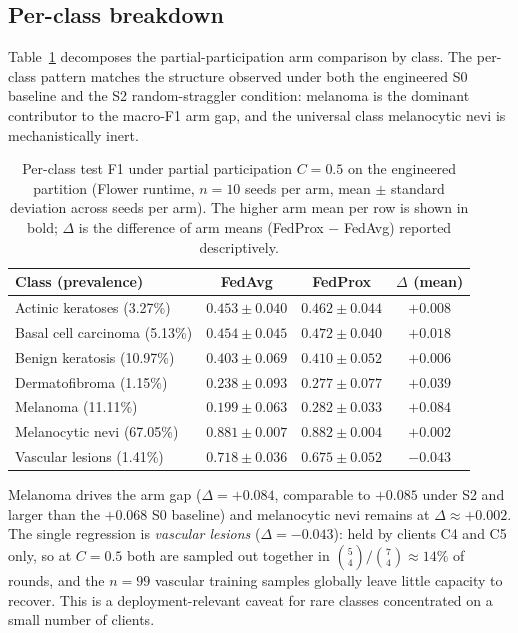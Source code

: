 \documentclass[11pt,a4paper]{report}
\begin{document}
\subsection{Per-class breakdown}
\label{sec:sh-partial-per-class}

Table~\ref{tab:sh-partial-per-class} decomposes the
partial-participation arm comparison by class. The per-class
pattern matches the structure observed under both the engineered
S0 baseline and the S2 random-straggler condition: melanoma is
the dominant contributor to the macro-F1 arm gap, and the
universal class melanocytic nevi is mechanistically inert.

\begin{table}[!htbp]
\centering
\caption{Per-class test F1 under partial participation $C = 0.5$
on the engineered partition (Flower runtime, $n = 10$ seeds per
arm, mean $\pm$ standard deviation across seeds per arm). The
higher arm mean per row is shown in bold; $\Delta$ is the
difference of arm means (FedProx $-$ FedAvg) reported
descriptively.}
\label{tab:sh-partial-per-class}
\small
\begin{tabular}{lccc}
\toprule
Class (prevalence) & FedAvg & FedProx & $\Delta$ (mean) \\
\midrule
Actinic keratoses (3.27\%)        & $0.453 \pm 0.040$ & $\mathbf{0.462 \pm 0.044}$ & $+0.008$ \\
Basal cell carcinoma (5.13\%)     & $0.454 \pm 0.045$ & $\mathbf{0.472 \pm 0.040}$ & $+0.018$ \\
Benign keratosis (10.97\%)        & $0.403 \pm 0.069$ & $\mathbf{0.410 \pm 0.052}$ & $+0.006$ \\
Dermatofibroma (1.15\%)           & $0.238 \pm 0.093$ & $\mathbf{0.277 \pm 0.077}$ & $+0.039$ \\
Melanoma (11.11\%)                & $0.199 \pm 0.063$ & $\mathbf{0.282 \pm 0.033}$ & $\mathbf{+0.084}$ \\
Melanocytic nevi (67.05\%)        & $\mathbf{0.881 \pm 0.007}$ & $0.882 \pm 0.004$ & $+0.002$ \\
Vascular lesions (1.41\%)         & $\mathbf{0.718 \pm 0.036}$ & $0.675 \pm 0.052$ & $-0.043$ \\
\bottomrule
\end{tabular}
\end{table}

Melanoma drives the arm gap ($\Delta = +0.084$, comparable to
$+0.085$ under S2 and larger than the $+0.068$ S0 baseline) and
melanocytic nevi remains at $\Delta \approx +0.002$. The single
regression is \emph{vascular lesions} ($\Delta = -0.043$): held by
clients C4 and C5 only, so at $C = 0.5$ both are sampled out
together in $\binom{5}{4}/\binom{7}{4} \approx 14\%$ of rounds,
and the $n = 99$ vascular training samples globally leave little
capacity to recover. This is a deployment-relevant caveat for rare
classes concentrated on a small number of clients.
\end{document}
